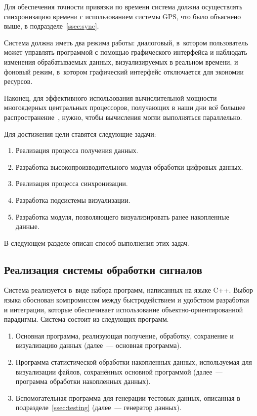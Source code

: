 \documentclass[a4paper, 14pt, titlepage]{extarticle}
\begin{document}
  Для обеспечения точности привязки по времени система должна осуществлять синхронизацию времени с
  использованием системы GPS, что было объяснено выше, в подразделе~\ref{ssec:sync}.

  Система должна иметь два режима работы: диалоговый, в~котором пользователь может управлять
  программой с помощью графического интерфейса и наблюдать изменения обрабатываемых данных,
  визуализируемых в реальном времени, и фоновый режим, в~котором графический интерфейс отключается
  для экономии ресурсов.

  Наконец, для эффективного использования вычислительной мощности многоядерных центральных
  процессоров, получающих в наши дни всё большее распространение~\cite{steam-hardware}, нужно, чтобы
  вычисления могли выполняться параллельно.

  Для достижения цели ставятся следующие задачи:
  \begin{enumerate}
    \item Реализация процесса получения данных.
    \item Разработка высокопроизводительного модуля обработки цифровых данных.
    \item Реализация процесса синхронизации.
    \item Разработка подсистемы визуализации.
    \item Разработка модуля, позволяющего визуализировать ранее накопленные данные.
  \end{enumerate}

  В следующем разделе описан способ выполнения этих задач.

  \subsection{Реализация системы обработки сигналов}\label{ssec:impl}

  Система реализуется в~виде набора программ, написанных на языке C++. Выбор языка обоснован
  компромиссом между быстродействием и удобством разработки и интеграции, которые обеспечивает
  использование объектно-ориентированной парадигмы. Система состоит из следующих программ.

  \begin{enumerate}
    \item Основная программа, реализующая получение, обработку, сохранение и визуализацию данных
      (далее~--- основная программа).
    \item Программа статистической обработки накопленных данных, используемая для визуализации
      файлов, сохранённых основной программой (далее~--- программа обработки накопленных данных).
    \item Вспомогательная программа для генерации тестовых данных, описанная в подразделе~\ref{ssec:testing}
      (далее~--- генератор данных).
  \end{enumerate}
\end{document}
